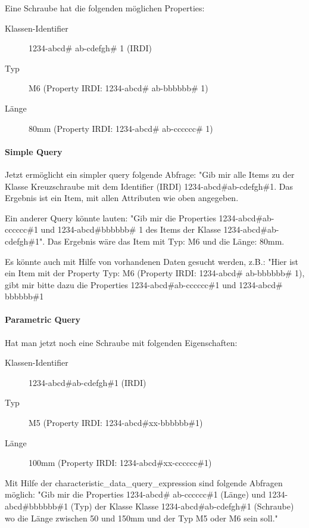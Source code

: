 Eine Schraube hat die folgenden möglichen Properties: 

\begin{description}
\item[Klassen-Identifier] 1234-abcd\# ab-cdefgh\# 1 (IRDI)
\item[Typ] M6 (Property IRDI: 1234-abcd\# ab-bbbbbb\# 1)
\item[Länge] 80mm (Property IRDI: 1234-abcd\# ab-cccccc\# 1)
\end{description}

\paragraph{Simple Query}

Jetzt ermöglicht ein simpler query folgende Abfrage: "Gib mir alle Items zu der Klasse Kreuzschraube mit dem Identifier (IRDI) 1234-abcd\#ab-cdefgh\#1. Das Ergebnis ist ein Item, mit allen Attributen wie oben angegeben. 

Ein anderer Query könnte lauten: "Gib mir die Properties 1234-abcd\#ab-cccccc\#1 und 1234-abcd\#bbbbbb\# 1 des Items der Klasse 1234-abcd\#ab-cdefgh\#1". Das Ergebnis wäre das Item mit Typ: M6 und die Länge: 80mm.

Es könnte auch mit Hilfe von vorhandenen Daten gesucht werden, z.B.: "Hier ist ein Item mit der Property Typ: M6 (Property IRDI: 1234-abcd\# ab-bbbbbb\# 1), gibt mir bitte dazu die Properties 1234-abcd\#ab-cccccc\#1 und 1234-abcd\# bbbbbb\#1 

\paragraph{Parametric Query}

Hat man jetzt noch eine Schraube mit folgenden Eigenschaften:
\begin{description}
\item[Klassen-Identifier] 1234-abcd\#ab-cdefgh\#1 (IRDI)
\item[Typ] M5 (Property IRDI: 1234-abcd\#xx-bbbbbb\#1)
\item[Länge] 100mm (Property IRDI: 1234-abcd\#xx-cccccc\#1)
\end{description}


Mit Hilfe der characteristic\_data\_query\_expression sind folgende Abfragen möglich: "Gib mir die Properties 1234-abcd\# ab-cccccc\#1 (Länge) und 1234-abcd\#bbbbbb\#1 (Typ) der Klasse Klasse 1234-abcd\#ab-cdefgh\#1 (Schraube) wo die Länge zwischen 50 und 150mm und der Typ M5 oder M6 sein soll."


